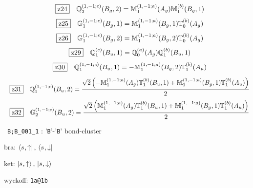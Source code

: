 \documentclass[fleqn,10pt,landscape]{jsarticle}
\begin{document}
\begin{dmath*}
\hspace*{3mm}\fbox{z24}\quad \mathbb{Q}_{2}^{(1,-1;c)}(B_{g},2)=\mathbb{M}_{1}^{(1,-1;a)}(A_{g}) \mathbb{M}_{1}^{(b)}(B_{g},1)
\end{dmath*}
\begin{dmath*}
\hspace*{3mm}\fbox{z25}\quad \mathbb{G}_{1}^{(1,-1;c)}(B_{g},1)=\mathbb{M}_{1}^{(1,-1;a)}(B_{g},1) \mathbb{T}_{0}^{(b)}(A_{g})
\end{dmath*}
\begin{dmath*}
\hspace*{3mm}\fbox{z26}\quad \mathbb{G}_{1}^{(1,-1;c)}(B_{g},2)=\mathbb{M}_{1}^{(1,-1;a)}(B_{g},2) \mathbb{T}_{0}^{(b)}(A_{g})
\end{dmath*}
\begin{dmath*}
\hspace*{3mm}\fbox{z29}\quad \mathbb{Q}_{1}^{(c)}(B_{u},1)=\mathbb{Q}_{0}^{(a)}(A_{g}) \mathbb{Q}_{1}^{(b)}(B_{u},1)
\end{dmath*}
\begin{dmath*}
\hspace*{3mm}\fbox{z30}\quad \mathbb{Q}_{1}^{(1,-1;c)}(B_{u},1)=- \mathbb{M}_{1}^{(1,-1;a)}(B_{g},2) \mathbb{T}_{1}^{(b)}(A_{u})
\end{dmath*}
\begin{dmath*}
\hspace*{3mm}\fbox{z31}\quad \mathbb{Q}_{1}^{(1,-1;c)}(B_{u},2)=\frac{\sqrt{2} \left(- \mathbb{M}_{1}^{(1,-1;a)}(A_{g}) \mathbb{T}_{1}^{(b)}(B_{u},1) + \mathbb{M}_{1}^{(1,-1;a)}(B_{g},1) \mathbb{T}_{1}^{(b)}(A_{u})\right)}{2}
\end{dmath*}
\begin{dmath*}
\hspace*{3mm}\fbox{z32}\quad \mathbb{G}_{2}^{(1,-1;c)}(B_{u},2)=\frac{\sqrt{2} \left(\mathbb{M}_{1}^{(1,-1;a)}(A_{g}) \mathbb{T}_{1}^{(b)}(B_{u},1) + \mathbb{M}_{1}^{(1,-1;a)}(B_{g},1) \mathbb{T}_{1}^{(b)}(A_{u})\right)}{2}
\end{dmath*}
\vspace{5mm}

\noindent\textbullet\, \texttt{B;B_001_1} : '\texttt{B}'-'\texttt{B}' bond-cluster

\noindent\quad * bra: $\bra{s_{},\uparrow},\, \bra{s_{},\downarrow}$

\noindent\quad * ket: $\ket{s_{},\uparrow},\, \ket{s_{},\downarrow}$

\noindent\quad * wyckoff: \texttt{1a@1b}
\end{document}
